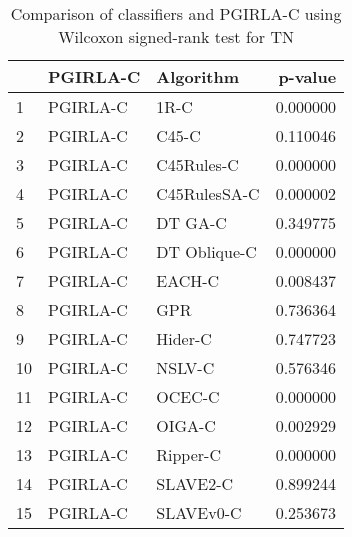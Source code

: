 \begin{table}
\footnotesize
\caption{Comparison of classifiers and PGIRLA-C using Wilcoxon signed-rank test for TN}
\label{tab:PGIRLA-C wilcoxon TN comparison}
\begin{tabular}{lllr}
\hline
 & PGIRLA-C & Algorithm & p-value \\
\hline
1 & PGIRLA-C & 1R-C & 0.000000 \\
2 & PGIRLA-C & C45-C & 0.110046 \\
3 & PGIRLA-C & C45Rules-C & 0.000000 \\
4 & PGIRLA-C & C45RulesSA-C & 0.000002 \\
5 & PGIRLA-C & DT GA-C & 0.349775 \\
6 & PGIRLA-C & DT Oblique-C & 0.000000 \\
7 & PGIRLA-C & EACH-C & 0.008437 \\
8 & PGIRLA-C & GPR & 0.736364 \\
9 & PGIRLA-C & Hider-C & 0.747723 \\
10 & PGIRLA-C & NSLV-C & 0.576346 \\
11 & PGIRLA-C & OCEC-C & 0.000000 \\
12 & PGIRLA-C & OIGA-C & 0.002929 \\
13 & PGIRLA-C & Ripper-C & 0.000000 \\
14 & PGIRLA-C & SLAVE2-C & 0.899244 \\
15 & PGIRLA-C & SLAVEv0-C & 0.253673 \\
\hline
\end{tabular}
\end{table}
